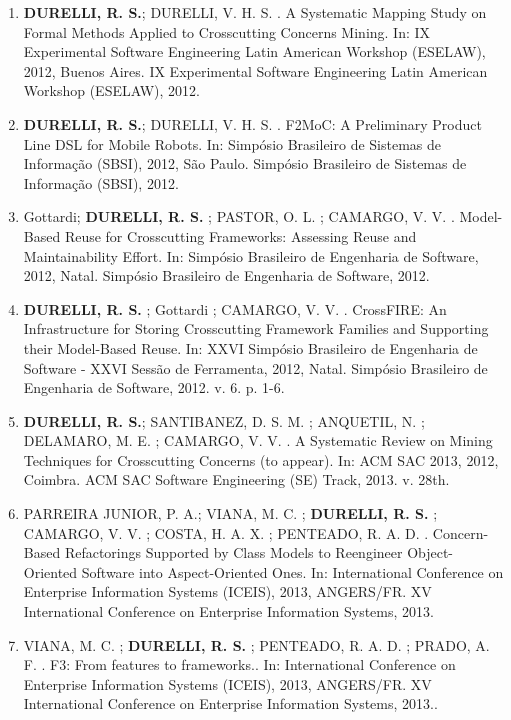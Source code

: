 \documentclass[12pt]{article}
\begin{document}
\begin{itemize}
\begin{enumerate}
	    \item \textbf{DURELLI, R. S.}; DURELLI, V. H. S. . A Systematic Mapping Study on Formal Methods Applied to Crosscutting Concerns Mining. In: IX Experimental Software Engineering Latin American Workshop (ESELAW), 2012, Buenos Aires. IX Experimental Software Engineering Latin American Workshop (ESELAW), 2012.
	 	
	 	\item \textbf{DURELLI, R. S.}; DURELLI, V. H. S. . F2MoC: A Preliminary Product Line DSL for Mobile Robots. In: Simpósio Brasileiro de Sistemas de Informação (SBSI), 2012, São Paulo. Simpósio Brasileiro de Sistemas de Informação (SBSI), 2012.
	 	
	 	\item Gottardi; \textbf{DURELLI, R. S.} ; PASTOR, O. L. ; CAMARGO, V. V. . Model-Based Reuse for Crosscutting Frameworks: Assessing Reuse and Maintainability Effort. In: Simpósio Brasileiro de Engenharia de Software, 2012, Natal. Simpósio Brasileiro de Engenharia de Software, 2012.
	 	\item \textbf{DURELLI, R. S.} ; Gottardi ; CAMARGO, V. V. . CrossFIRE: An Infrastructure for Storing Crosscutting Framework Families and Supporting their Model-Based Reuse. In: XXVI Simpósio Brasileiro de Engenharia de Software - XXVI Sessão de Ferramenta, 2012, Natal. Simpósio Brasileiro de Engenharia de Software, 2012. v. 6. p. 1-6.
	 	
	 	\item \textbf{DURELLI, R. S.}; SANTIBANEZ, D. S. M. ; ANQUETIL, N. ; DELAMARO, M. E. ; CAMARGO, V. V. . A Systematic Review on Mining Techniques for Crosscutting Concerns (to appear). In: ACM SAC 2013, 2012, Coimbra. ACM SAC Software Engineering (SE) Track, 2013. v. 28th.
	
	 	\item PARREIRA JUNIOR, P. A.; VIANA, M. C. ; \textbf{DURELLI, R. S.} ; CAMARGO, V. V. ; COSTA, H. A. X. ; PENTEADO, R. A. D. . Concern-Based Refactorings Supported by Class Models to Reengineer Object-Oriented Software into Aspect-Oriented Ones. In: International Conference on Enterprise Information Systems (ICEIS), 2013, ANGERS/FR. XV International Conference on Enterprise Information Systems, 2013.
		
		\item VIANA, M. C. ; \textbf{DURELLI, R. S.} ; PENTEADO, R. A. D. ; PRADO, A. F. . F3: From features to frameworks.. In: International Conference on Enterprise Information Systems (ICEIS), 2013, ANGERS/FR. XV International Conference on Enterprise Information Systems, 2013..
		

\end{enumerate}
\end{itemize}
\end{document}
